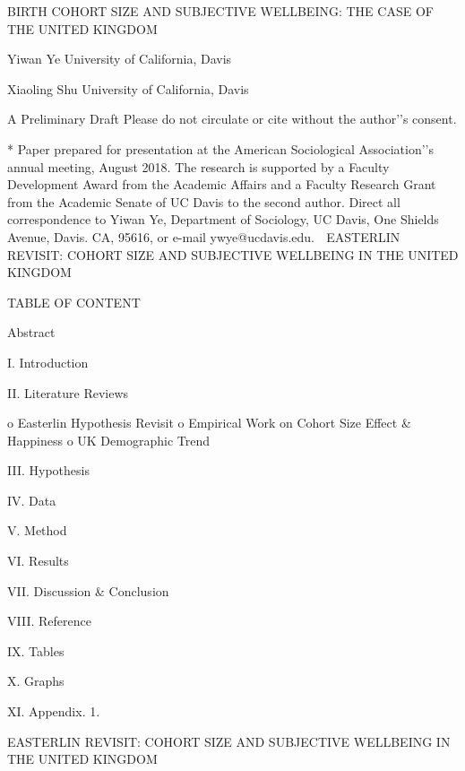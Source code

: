 






BIRTH COHORT SIZE AND SUBJECTIVE WELLBEING:
 THE CASE OF THE UNITED KINGDOM

Yiwan Ye
University of California, Davis

Xiaoling Shu
University of California, Davis


A Preliminary Draft
Please do not circulate or cite without the author’’s consent.






* Paper prepared for presentation at the American Sociological Association’’s annual meeting, August 2018. The research is supported by a Faculty Development Award from the Academic Affairs and a Faculty Research Grant from the Academic Senate of UC Davis to the second author. Direct all correspondence to Yiwan Ye, Department of Sociology, UC Davis, One Shields Avenue, Davis. CA, 95616, or e-mail ywye@ucdavis.edu.

EASTERLIN REVISIT:
COHORT SIZE AND SUBJECTIVE WELLBEING IN THE UNITED KINGDOM

TABLE OF CONTENT

Abstract

I. Introduction

II. Literature Reviews

o	Easterlin Hypothesis Revisit
o	Empirical Work on Cohort Size Effect & Happiness
o	UK Demographic Trend

III. Hypothesis

IV. Data

V. Method

VI. Results

VII. Discussion & Conclusion

VIII. Reference
 
IX. Tables

X. Graphs

XI. Appendix.
1.	

EASTERLIN REVISIT:
COHORT SIZE AND SUBJECTIVE WELLBEING IN THE UNITED KINGDOM

